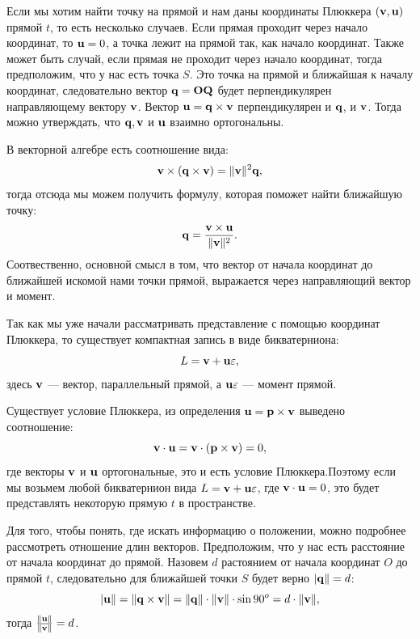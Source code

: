 Если мы хотим найти точку на прямой и нам даны координаты Плюккера $(\vb{v}, \vb{u})$ прямой $t$, то есть несколько случаев. Если прямая проходит через начало координат, то $\vb{u} = 0$, а точка лежит на прямой так, как начало координат. Также может быть случай, если прямая не проходит через начало координат, тогда предположим, что у нас есть точка $S$. Это точка на прямой и ближайшая к началу координат, следовательно вектор $\vb{q} = \vb{OQ}$ будет перпендикулярен направляющему вектору $\vb{v}$. Вектор $\vb{u} = \vb{q} \times \vb{v}$ перпендикулярен и $\vb{q}$, и $\vb{v}$.
Тогда можно утверждать, что $\vb{q}, \vb{v}$ и $\vb{u}$ взаимно ортогональны.

В векторной алгебре есть соотношение вида:
\begin{equation*}
    \vb{v} \times (\vb{q} \times \vb{v}) = \|\vb{v}\|^2 \vb{q},
\end{equation*}
тогда отсюда мы можем получить формулу, которая поможет найти ближайшую точку:
\begin{equation*}
    \vb{q} = \frac{\vb{v} \times \vb{u}}{\|\vb{v}\|^2}.
\end{equation*}
Соотвественно, основной смысл в  том, что вектор от начала координат до ближайшей искомой нами точки прямой, выражается через направляющий вектор и момент.

Так как мы уже начали рассматривать представление с помощью координат Плюккера, то существует компактная запись в виде бикватерниона:
\begin{equation*}
    L = \vb{v} + \vb{u}\varepsilon,
\end{equation*}
здесь $\vb{v}$ ---  вектор, параллельный прямой, а $\vb{u}\varepsilon$ ---  момент прямой.

Существует условие Плюккера, из определения $\vb{u} = \vb{p} \times \vb{v}$ выведено соотношение:
\begin{equation*}
    \vb{v} \cdot \vb{u} = \vb{v} \cdot (\vb{p} \times \vb{v}) = 0,
\end{equation*}
где векторы $\vb{v}$ и $\vb{u}$ ортогональные, это и есть условие Плюккера.Поэтому если мы возьмем любой бикватернион вида $L = \vb{v} + \vb{u}\varepsilon$, где $ \vb{v} \cdot \vb{u} = 0$, это будет представлять некоторую прямую $t$ в пространстве.

Для того, чтобы понять, где искать информацию о положении, можно подробнее рассмотреть отношение длин векторов. Предположим, что у нас есть расстояние от начала координат до прямой.
Назовем $d$ растоянием от начала координат $O$ до прямой $t$, следовательно для ближайшей точки $S$ будет верно $|\vb{q}\| = d$:
\begin{equation*}
    |\vb{u}\| = \|\vb{q} \times \vb{v}\| = \|\vb{q}\| \cdot \|\vb{v}\| \cdot \sin 90^o = d \cdot \|\vb{v}\|,
\end{equation*}
тогда $\frac{\|\vb{u}\|}{\|\vb{v}\|} = d$.

